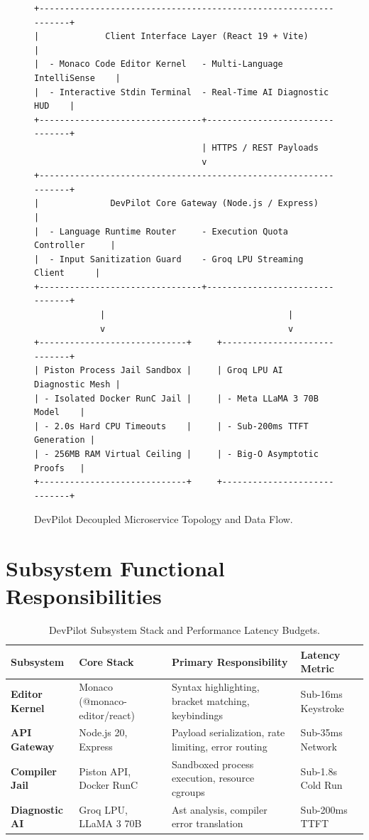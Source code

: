 \documentclass[12pt,a4paper]{report}
\begin{document}
\begin{figure}[htbp]
\centering
\footnotesize
\begin{verbatim}
+-----------------------------------------------------------------+
|             Client Interface Layer (React 19 + Vite)            |
|  - Monaco Code Editor Kernel   - Multi-Language IntelliSense    |
|  - Interactive Stdin Terminal  - Real-Time AI Diagnostic HUD    |
+--------------------------------+--------------------------------+
                                 | HTTPS / REST Payloads
                                 v
+-----------------------------------------------------------------+
|              DevPilot Core Gateway (Node.js / Express)          |
|  - Language Runtime Router     - Execution Quota Controller     |
|  - Input Sanitization Guard    - Groq LPU Streaming Client      |
+--------------------------------+--------------------------------+
             |                                    |
             v                                    v
+-----------------------------+     +-----------------------------+
| Piston Process Jail Sandbox |     | Groq LPU AI Diagnostic Mesh |
| - Isolated Docker RunC Jail |     | - Meta LLaMA 3 70B Model    |
| - 2.0s Hard CPU Timeouts    |     | - Sub-200ms TTFT Generation |
| - 256MB RAM Virtual Ceiling |     | - Big-O Asymptotic Proofs   |
+-----------------------------+     +-----------------------------+
\end{verbatim}
\caption{DevPilot Decoupled Microservice Topology and Data Flow.}
\label{fig:devpilot_topology}
\end{figure}

\section{Subsystem Functional Responsibilities}

\begin{table}[htbp]
\centering
\small
\begin{tabularx}{\linewidth}{>{\raggedright\arraybackslash\bfseries}p{2.3cm}>{\raggedright\arraybackslash}X>{\raggedright\arraybackslash}X>{\raggedright\arraybackslash}p{2.0cm}}
\toprule
Subsystem & Core Stack & Primary Responsibility & Latency Metric \\
\midrule
Editor Kernel & Monaco (@monaco-editor/react) & Syntax highlighting, bracket matching, keybindings & Sub-16ms Keystroke \\
\addlinespace
API Gateway & Node.js 20, Express & Payload serialization, rate limiting, error routing & Sub-35ms Network \\
\addlinespace
Compiler Jail & Piston API, Docker RunC & Sandboxed process execution, resource cgroups & Sub-1.8s Cold Run \\
\addlinespace
Diagnostic AI & Groq LPU, LLaMA 3 70B & Ast analysis, compiler error translation & Sub-200ms TTFT \\
\bottomrule
\end{tabularx}
\caption{DevPilot Subsystem Stack and Performance Latency Budgets.}
\label{tab:devpilot_subsystems}
\end{table}
\end{document}

